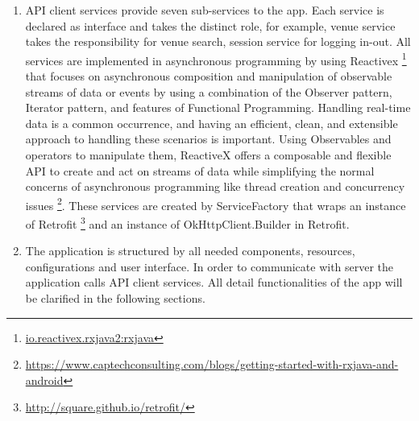  \begin{enumerate}
	\item API client services provide seven sub-services to the app. Each service is declared as interface and takes the distinct role, for example, venue service takes the responsibility for venue search, session service for logging in-out. All services are implemented in asynchronous programming by using Reactivex \footnote{\url{io.reactivex.rxjava2:rxjava}}  that focuses on asynchronous composition and manipulation of observable streams of data or events by using a combination of the Observer pattern, Iterator pattern, and features of Functional Programming. Handling real-time data is a common occurrence, and having an efficient, clean, and extensible approach to handling these scenarios is important. Using Observables and operators to manipulate them, ReactiveX offers a composable and flexible API to create and act on streams of data while simplifying the normal concerns of asynchronous programming like thread creation and concurrency issues \footnote{\url{https://www.captechconsulting.com/blogs/getting-started-with-rxjava-and-android}}. These services are created by ServiceFactory that wraps an instance of Retrofit \footnote{\url{http://square.github.io/retrofit/}} and an instance of OkHttpClient.Builder in Retrofit.

	\item The application is structured by all needed components, resources, configurations and user interface. In order to communicate with server the application calls API client services. All detail functionalities of the app will be clarified in the following sections.
\end{enumerate}
